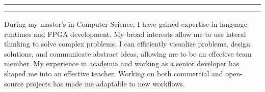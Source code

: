 \documentclass[9.5pt]{developercv} %
\begin{document}
{{    %
        \hspace*{\fill}\rule{\lineWidth}{.4pt}\hspace*{\fill}

        \vspace*{-\topLen}
        \hspace*{\fill}\rule{.4pt}{\topLen+\bottomLen}\hspace*{\fill}
        \vspace*{-\bottomLen}
    }

    \vspace*{-\baselineskip}
    \begin{multicols}{2}
        
        \RTLpar\sloppy

        During my master's in Computer Science, I have gained expertise in language runtimes and FPGA development.
        My broad interests allow me to use lateral thinking to solve complex problems.
        I can efficiently visualize problems, design solutions, and communicate abstract ideas, allowing me to be an effective team member.
        My experience in academia and working as a senior developer has shaped me into an effective teacher.
        Working on both commercial and open-source projects has made me adaptable to new workflows.

        \vspace*{\fill}
        \columnbreak

        \justifying \sloppy


        \vspace*{-4pt}

        \vspace*{5pt}

\ifdefined{}  \fi

        \vspace*{-4pt}
        \vspace*{5pt}


        \vspace*{-4pt}

        \vspace*{\fill}
    \end{multicols}
    }
\end{document}
